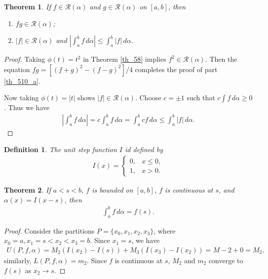 \documentclass[10pt]{book}
\newtheorem{definition}{Definition}[chapter]
\newtheorem{theorem}{Theorem}[chapter]
\theoremstyle{definition}
\numberwithin{equation}{chapter}
\begin{document}
\medskip

\begin{theorem}\label{th_510}
If $f \in \mathscr{R}(\alpha)$ and $g \in \mathscr{R}(\alpha)$ on $[a,b]$, then
\begin{enumerate}[label=(\alph*)]
    \item $fg \in \mathscr{R}(\alpha)$; \label{th_510_a}
    
    \item $\left|f\right| \in \mathscr{R}(\alpha)$ and $\displaystyle \left|\int^b_a f \,d\alpha\right| \leq \int^b_a \left|f\right| \,d\alpha$. \label{th_510_b}
\end{enumerate}
\end{theorem}
\begin{proof}
Taking $\phi(t) = t^2$ in Theorem \ref{th_58} implies $f^2 \in \mathscr{R}(\alpha)$. Then the equation $fg = [(f + g)^2 - (f - g)^2]/4$ completes the proof of part \ref{th_510_a}.

Now taking $\phi(t) = \left|t\right|$ shows $\left|f\right| \in \mathscr{R}(\alpha)$. Choose $c = \pm 1$ such that $c \int f \,d\alpha \geq 0$. Thus we have
\begin{align*}
    \left|\int^b_a f \,d\alpha\right| = c \int^b_a f \,d\alpha = \int^b_a cf \,d\alpha \leq \int^b_a \left|f\right| \,d\alpha.
\end{align*}
\end{proof}

\medskip

\begin{definition}
The unit step function $I$ id defined by
\begin{align*}
    I(x) = \begin{cases}
        0, & x \leq 0, \\
        1, & x > 0.
    \end{cases}
\end{align*}
\end{definition}

\medskip

\begin{theorem}\label{th_511}
If $a < s < b$, $f$ is bounded on $[a,b]$, $f$ is continuous at $s$, and $\alpha(x) = I(x - s)$, then
\begin{align*}
    \int^b_a f \,d\alpha = f(s).
\end{align*}
\end{theorem}
\begin{proof}
Consider the partitions $P = \{x_0, x_1, x_2, x_3\}$, where $x_0 = a, x_1 = s < x_2 < x_3 = b$. Since $x_1 = s$, we have
\begin{align*}
    U(P,f,\alpha) = M_2 \left(I(x_2) - I(s)\right) + M_3 \left(I(x_3) - I(x_2)\right) = M-2 + 0 = M_2,
\end{align*}
similarly, $L(P,f,\alpha) = m_2$. Since $f$ is continuous at $s$, $M_2$ and $m_2$ converge to $f(s)$ as $x_2 \to s$.
\end{proof}
\end{document}
